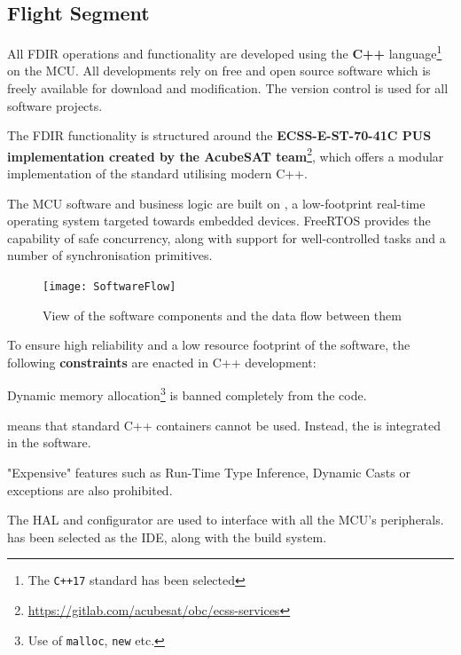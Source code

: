 \documentclass[a4paper,nobib]{tufte-book}
\begin{document}
\subsection{Flight Segment}

All \ac{FDIR} operations and functionality are developed using the \textbf{C++} language\footnote{The \texttt{C++17} standard has been selected} on the \ac{MCU}. All developments rely on free and open source software which is freely available for download and modification. The  version control is used for all software projects.

The \ac{FDIR} functionality is structured around the \textbf{ECSS-E-ST-70-41C \ac{PUS} implementation created by the AcubeSAT team}\footnote{\url{https://gitlab.com/acubesat/obc/ecss-services}}, which offers a modular implementation of the standard utilising modern C++.

The \ac{MCU} software and business logic are built on \textbf{}, a low-footprint real-time operating system targeted towards embedded devices. FreeRTOS provides the capability of safe concurrency, along with support for well-controlled tasks and a number of synchronisation primitives.

\begin{figure}[h]
	\texttt{[image: SoftwareFlow]}
	\caption{View of the software components and the data flow between them}
	\label{sec:softwareflow}
\end{figure}

To ensure high reliability and a low resource footprint of the software, the following \textbf{constraints} are enacted in C++ development:
\begin{compactenum}
	\item Dynamic memory allocation\footnote{Use of \texttt{malloc}, \texttt{new} etc.} is banned completely from the code.
	\label{itm:malloc}
	\item {} means that standard C++ containers cannot be used. Instead, the  is integrated in the software.
	\item "Expensive" features such as Run-Time Type Inference, Dynamic Casts or exceptions are also prohibited.
\end{compactenum}

The  \ac{HAL} and configurator are used to interface with all the \acs{MCU}'s peripherals.  has been selected as the \acs{IDE}, along with the  build system.
\end{document}
